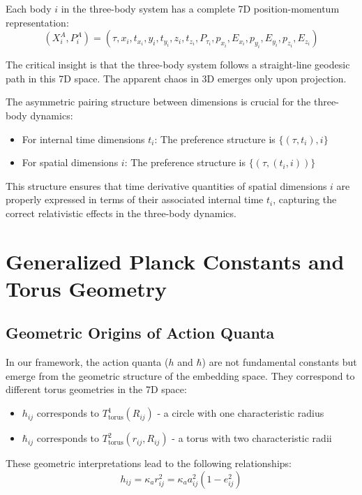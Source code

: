 \documentclass{article}
\begin{document}
Each body $i$ in the three-body system has a complete 7D position-momentum representation:
\begin{equation}
(X^A_i, P^A_i) = (\tau, x_i, t_{x_i}, y_i, t_{y_i}, z_i, t_{z_i}, P_{\tau_i}, p_{x_i}, E_{x_i}, p_{y_i}, E_{y_i}, p_{z_i}, E_{z_i})
\end{equation}

The critical insight is that the three-body system follows a straight-line geodesic path in this 7D space. The apparent chaos in 3D emerges only upon projection.

The asymmetric pairing structure between dimensions is crucial for the three-body dynamics:
\begin{itemize}
\item For internal time dimensions $t_i$: The preference structure is $\{(\tau, t_i), i\}$
\item For spatial dimensions $i$: The preference structure is $\{(\tau, (t_i, i))\}$
\end{itemize}

This structure ensures that time derivative quantities of spatial dimensions $i$ are properly expressed in terms of their associated internal time $t_i$, capturing the correct relativistic effects in the three-body dynamics.

\section{Generalized Planck Constants and Torus Geometry}

\subsection{Geometric Origins of Action Quanta}

In our framework, the action quanta ($h$ and $\hbar$) are not fundamental constants but emerge from the geometric structure of the embedding space. They correspond to different torus geometries in the 7D space:

\begin{itemize}
\item $h_{ij}$ corresponds to $T^1_{\text{torus}}(R_{ij})$ - a circle with one characteristic radius
\item $\hbar_{ij}$ corresponds to $T^2_{\text{torus}}(r_{ij}, R_{ij})$ - a torus with two characteristic radii
\end{itemize}

These geometric interpretations lead to the following relationships:
\begin{equation}
h_{ij} = \kappa_a r_{ij}^2 = \kappa_a a_{ij}^2(1-e_{ij}^2)
\end{equation}
\end{document}
